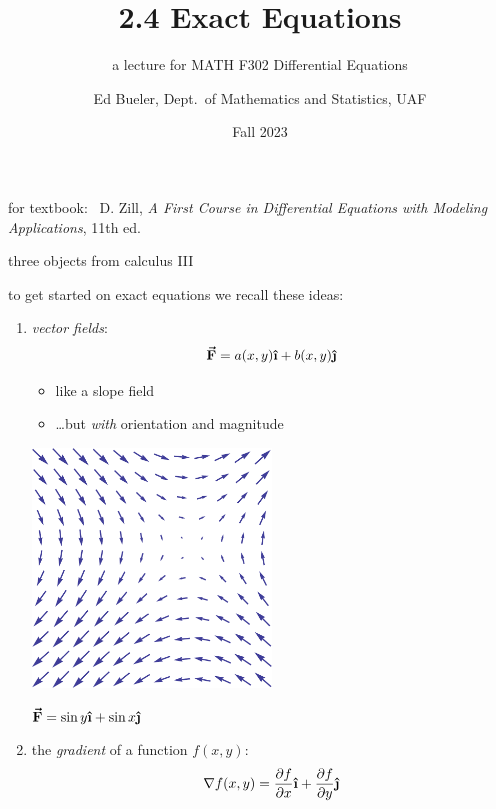 \documentclass{beamer}
\title{2.4 Exact Equations}
\subtitle{a lecture for MATH F302 Differential Equations}
\author{Ed Bueler, Dept.~of Mathematics and Statistics, UAF}
\date{Fall 2023}
\newcommand{\grad}{\nabla}
\newcommand{\ih}{\boldsymbol{\hat{\textbf{\i}}}}
\newcommand{\jh}{\boldsymbol{\hat{\textbf{\j}}}}
\newcommand{\vF}{\boldsymbol{\vec{\textbf{F}}}}
\begin{document}


\begin{frame}
\titlepage

\centerline{\tiny for textbook: \, D. Zill, \emph{A First Course in Differential Equations with Modeling Applications}, 11th ed.}
\end{frame}


\begin{frame}{three objects from calculus III}

to get started on exact equations we recall these ideas:
\begin{enumerate}
\item \begin{minipage}[t]{0.4\textwidth}
\emph{vector fields}:
    $$\vF = a(x,y) \ih + b(x,y) \jh$$

\vspace{-3mm}
    \begin{itemize}
    \small
    \item like a slope field

    \vspace{-2mm}
    \item \dots but \emph{with} orientation and magnitude
    \end{itemize}
\end{minipage}
\begin{minipage}[t]{0.5\textwidth}
\vspace{-2mm}

\hfill \includegraphics[width=0.5\textwidth]{figs/VectorField.pdf}

\hfill \tiny $\boldsymbol{\vec{\textbf{F}}} = \sin y \ih + \sin x \jh$
\end{minipage}

\vspace{-3mm}
\item the \emph{gradient} of a function $f(x,y)$:
    $$\grad f(x,y) = \frac{\partial f}{\partial x} \ih + \frac{\partial f}{\partial y} \jh$$


\end{enumerate}
\end{frame}
\end{document}
